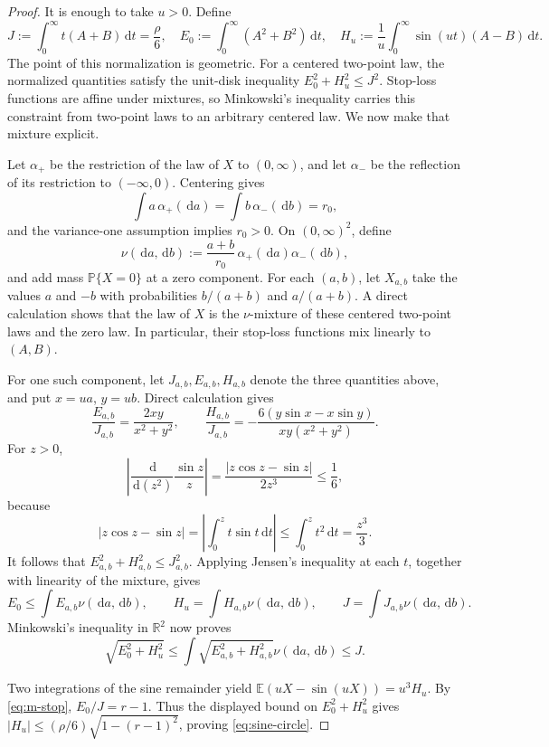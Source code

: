 \documentclass[11pt]{article}
\newcommand{\E}{\mathbb E}
\newcommand{\Pp}{\mathbb P}
\newcommand{\R}{\mathbb R}
\newcommand{\dd}{\,\mathrm d}
\newcommand{\abs}[1]{\lvert#1\rvert}
\begin{document}
\begin{proof}
It is enough to take \(u>0\).  Define
\[
 J:=\int_0^\infty t(A+B)\dd t=\frac\rho6,
 \quad E_0:=\int_0^\infty(A^2+B^2)\dd t,
 \quad H_u:=\frac1u\int_0^\infty\sin(ut)(A-B)\dd t.
\]
The point of this normalization is geometric.  For a centered two-point law,
the normalized quantities satisfy the unit-disk inequality
\(E_0^2+H_u^2\le J^2\).  Stop-loss functions are affine under mixtures, so
Minkowski's inequality carries this constraint from two-point laws to an
arbitrary centered law.  We now make that mixture explicit.

Let \(\alpha_+\) be the restriction
of the law of \(X\) to \((0,\infty)\), and let \(\alpha_-\) be the reflection
of its restriction to \(( -\infty,0)\).  Centering gives
\[
 \int a\,\alpha_+(\dd a)=\int b\,\alpha_-(\dd b)=r_0,
\]
and the variance-one assumption implies \(r_0>0\).
On \((0,\infty)^2\), define
\[
 \nu(\dd a,\dd b):=\frac{a+b}{r_0}\,
 \alpha_+(\dd a)\alpha_-(\dd b),
\]
and add mass \(\Pp\{X=0\}\) at a zero component.  For each \((a,b)\), let
\(X_{a,b}\) take the values \(a\) and \(-b\) with probabilities
\(b/(a+b)\) and \(a/(a+b)\).  A direct calculation shows that the law of
\(X\) is the \(\nu\)-mixture of these centered two-point laws and the zero
law.  In particular, their stop-loss functions mix linearly to \((A,B)\).

For one such component, let \(J_{a,b},E_{a,b},H_{a,b}\) denote the three
quantities above, and put \(x=ua\), \(y=ub\).  Direct calculation gives
\[
 \frac{E_{a,b}}{J_{a,b}}=\frac{2xy}{x^2+y^2},\qquad
 \frac{H_{a,b}}{J_{a,b}}
 =-\frac{6(y\sin x-x\sin y)}{xy(x^2+y^2)}.
\]
For \(z>0\),
\[
 \left|\frac{\dd}{\dd(z^2)}\frac{\sin z}{z}\right|
 =\frac{\abs{z\cos z-\sin z}}{2z^3}\le\frac16,
\]
because
\[
 \abs{z\cos z-\sin z}
 =\left|\int_0^z t\sin t\dd t\right|
 \le\int_0^z t^2\dd t=\frac{z^3}{3}.
\]
It follows that \(E_{a,b}^2+H_{a,b}^2\le J_{a,b}^2\). Applying Jensen's
inequality at each \(t\), together with linearity of the mixture, gives
\[
 E_0\le\int E_{a,b}\nu(\dd a,\dd b),\qquad
 H_u=\int H_{a,b}\nu(\dd a,\dd b),\qquad
 J=\int J_{a,b}\nu(\dd a,\dd b).
\]
Minkowski's inequality in \(\R^2\) now proves
\[
 \sqrt{E_0^2+H_u^2}
 \le\int\sqrt{E_{a,b}^2+H_{a,b}^2}\nu(\dd a,\dd b)
 \le J.
\]

Two integrations of the sine remainder yield
\(\E(uX-\sin(uX))=u^3H_u\).  By \eqref{eq:m-stop},
\(E_0/J=r-1\). Thus the displayed bound on \(E_0^2+H_u^2\) gives
\(\abs{H_u}\le(\rho/6)\sqrt{1-(r-1)^2}\), proving
\eqref{eq:sine-circle}.
\end{proof}
\end{document}
